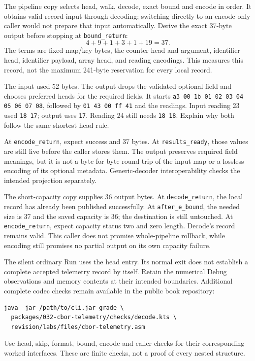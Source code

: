 The pipeline copy selects head, walk, decode, exact bound and encode in order.
It obtains valid record input through decoding; switching directly to an
encode-only caller would not prepare that input automatically. Derive the exact
37-byte output before stopping at \texttt{bound\_return}:
\[
  4+9+1+3+1+19=37.
\]
The terms are fixed map/key bytes, the counter head and argument, identifier head,
identifier payload, array head, and reading encodings. This measures this record,
not the maximum 241-byte reservation for every local record.

The input used 52 bytes. The output drops the validated optional field and chooses
preferred heads for the required fields. It starts
\texttt{a3 00 1b 01 02 03 04 05 06 07 08}, followed by
\texttt{01 43 00 ff 41} and the readings. Input reading 23 used
\texttt{18 17}; output uses \texttt{17}. Reading 24 still needs
\texttt{18 18}. Explain why both follow the same shortest-head rule.



At \texttt{encode\_return}, expect success and 37 bytes. At
\texttt{results\_ready}, those values are still live before the caller stores
them. The output preserves required field meanings, but it is not a byte-for-byte
round trip of the input map or a lossless encoding of its optional metadata.
Generic-decoder interoperability checks the intended projection separately.

The short-capacity copy supplies 36 output bytes. At \texttt{decode\_return},
the local record has already been published successfully. At
\texttt{after\_e\_bound}, the needed size is 37 and the saved capacity is 36;
the destination is still untouched. At \texttt{encode\_return}, expect capacity
status two and zero length. Decode's record remains valid. This caller does not
promise whole-pipeline rollback, while encoding still promises no partial output
on its own capacity failure.

The silent ordinary Run uses the head entry. Its normal exit does not establish
a complete accepted telemetry record by itself. Retain the numerical Debug
observations and memory contents at their intended boundaries. Additional complete
codec checks remain available in the public book repository:
\begin{verbatim}
java -jar /path/to/cli.jar grade \
  packages/032-cbor-telemetry/checks/decode.kts \
  revision/labs/files/cbor-telemetry.asm
\end{verbatim}
Use head, skip, format, bound, encode and caller checks for their corresponding
worked interfaces. These are finite checks, not a proof of every nested structure.

